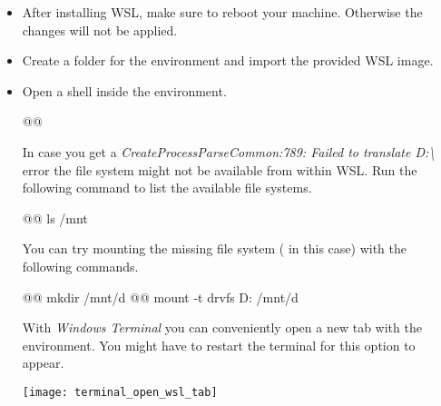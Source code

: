 \begin{itemize}
  \item After installing WSL, make sure to reboot your machine.
    Otherwise the changes will not be applied.

  \item Create a folder for the environment and import the provided WSL image.

  \item Open a shell inside the environment.

        \begin{monobox}
@\cmdinwsl{}@
\end{monobox}

    \begin{infobox}
      In case you get a \emph{CreateProcessParseCommon:789: Failed to translate D:\textbackslash} error the file system might not be available from within WSL.
      Run the following command to list the available file systems.

          \begin{monobox}
@\cmdinwsl{}@ ls /mnt
\end{monobox}

      You can try mounting the missing file system ( in this case) with the following commands.

          \begin{monobox}
@\cmdinwsl{}@ mkdir /mnt/d
@\cmdinwsl{}@ mount -t drvfs D: /mnt/d
\end{monobox}
    \end{infobox}
    \begin{infobox}
      With \emph{Windows Terminal} you can conveniently open a new tab with the environment.
      You might have to restart the terminal for this option to appear.
      \begin{center}
        \texttt{[image: terminal\_open\_wsl\_tab]}
      \end{center}
    \end{infobox}
\end{itemize}
